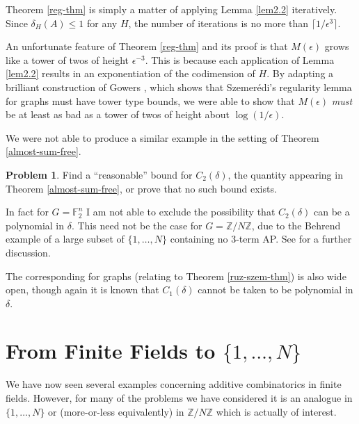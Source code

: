 \documentclass[12pt,a4paper,reqno]{amsart}
\numberwithin{equation}{section}
\theoremstyle{plain}
\theoremstyle{definition}
\newtheorem{problem}[subsection]{Problem}
\renewcommand{\leq}{\leqslant}
\begin{document}
\noindent Theorem \ref{reg-thm} is simply a matter of applying Lemma \ref{lem2.2} iteratively. Since $\delta_H(A) \leq 1$ for any $H$, the number of iterations is no more than $\lceil 1/\epsilon^3 \rceil$.\vspace{11pt}

\noindent An unfortunate feature of Theorem \ref{reg-thm} and its proof is that $M(\epsilon)$ grows like a tower of twos of height $\epsilon^{-3}$. This is because each application of Lemma \ref{lem2.2} results in an exponentiation of the codimension of $H$. By adapting a brilliant construction of Gowers \cite{gowers-tower}, which shows that Szemer\'edi's regularity lemma for graphs must have tower type bounds, we were able to show that $M(\epsilon)$ \textit{must} be at least as bad as a tower of twos of height about $\log(1/\epsilon)$.\vspace{11pt}

\noindent We were not able to produce a similar example in the setting of Theorem \ref{almost-sum-free}. 

\begin{problem}
Find a ``reasonable'' bound for $C_2(\delta)$, the quantity appearing in Theorem \ref{almost-sum-free}, or prove that no such bound exists.
\end{problem}

\noindent In fact for $G = \mathbb{F}_2^n$ I am not able to exclude the possibility that $C_2(\delta)$ can be a polynomial in $\delta$. This need not be the case for $G = \mathbb{Z}/N\mathbb{Z}$, due to the Behrend example of a large subset of $\{1,\dots, N\}$ containing no 3-term AP. See \cite{green-reg} for a further discussion.\vspace{11pt}

\noindent The corresponding for graphs (relating to Theorem \ref{ruz-szem-thm}) is also wide open, though again it is known that $C_1(\delta)$ cannot be taken to be polynomial in $\delta$.

\section{From Finite Fields to $\{1,\dots,N\}$}\label{sec8}

\noindent We have now seen several examples concerning additive combinatorics in finite fields. However, for many of the problems we have considered it is an analogue in $\{1,\dots,N\}$ or (more-or-less equivalently) in $\mathbb{Z}/N\mathbb{Z}$ which is actually of interest. \vspace{11pt}
\end{document}
